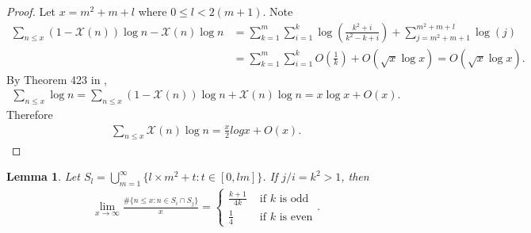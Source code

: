 \documentclass[a4paper,10pt]{amsart}
\newtheorem{lemma}{Lemma}[section]
\newcommand{\X}{\mathcal X}
\begin{document}
\begin{proof}
    Let $x = m^2 + m + l$ where $0 \leq l < 2(m+1)$. 
    Note
    \begin{align*}
        \sum_{n \leq x} (1-\X(n))\log n - \X(n)\log n &= 
        \sum^{m}_{k=1} \sum_{i=1}^{k}\log(\frac{k^2+ i}{k^{2}-k +i})
        +\sum_{j=m^2+m+1}^{m^2+m+l} \log(j) \\
        &=\sum^{m}_{k=1} \sum_{i=1}^{k} O(\frac{1}{k}) +  O(\sqrt{x}\log x)
        = O(\sqrt{x}\log x).
    \end{align*}
    By Theorem 423 in \cite{HW}, 
    \begin{align*}
        \sum_{n \leq x} \log n =\sum_{n \leq x} (1-\X(n))\log n + \X(n)\log n 
        = x\log x + O(x).
    \end{align*}
    Therefore
    \begin{align*}
        \sum_{n \leq x} \X(n)\log n = \frac{x}{2}logx + O(x).
    \end{align*} 
\end{proof}

\begin{lemma}\label{c_lam7}
    Let $S_{l} = \bigcup_{m=1}^{\infty}
    \{l\times m^2 + t : t \in [0, lm] \}$.
    If $j/i = k^2 > 1$, then
    \begin{align*}
        \lim_{x \rightarrow \infty} 
        \frac{\# \{n \leq x: n \in S_{i} \cap S_{j}\}}{x} = 
        \begin{cases}
            \frac{k+1}{4k} &\mbox{ if $k$ is odd}\\
            \frac{1}{4} &\mbox{ if $k$ is even}
        \end{cases}. 
    \end{align*}
\end{lemma}
\end{document}
